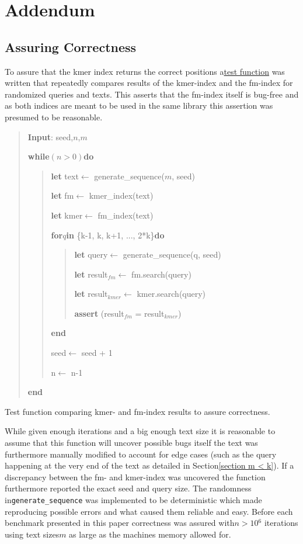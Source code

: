 \newpage{}

\chapter{Addendum}

\section{\label{Addendum: Correctness}Assuring Correctness}

To assure that the kmer index returns the correct positions a\href{https://github.com/google/googletest}{test function}
was written that repeatedly compares results of the kmer-index and
the fm-index for randomized queries and texts. This asserts that the
fm-index itself is bug-free and as both indices are meant to be used
in the same library this assertion was presumed to be reasonable.

\begin{algorithm}[H]
\begin{verse}
\textbf{Input}: seed,$n$,$m$

\textbf{while}$(n>0)$\textbf{do}
\begin{verse}
\textbf{let} text$\leftarrow$ generate\_sequence($m$, seed)

\textbf{let} fm$\leftarrow$ kmer\_index(text)

\textbf{let} kmer$\leftarrow$ fm\_index(text)

\textbf{for}$q$\textbf{in} \{k-1, k, k+1, ..., 2{*}k\}\textbf{do}
\begin{verse}
\textbf{let} query$\leftarrow$ generate\_sequence(q, seed)

\textbf{let} result$_{fm}$$\leftarrow$ fm.search(query)

\textbf{let} result$_{kmer}$$\leftarrow$ kmer.search(query)

\textbf{assert} (result$_{fm}$ = result$_{kmer}$)
\end{verse}
\textbf{end}

seed$\leftarrow$ seed + 1

n$\leftarrow$ n-1
\end{verse}
\textbf{end}
\end{verse}
\caption{Test function comparing kmer- and fm-index results to assure correctness.}
\end{algorithm}

While given enough iterations and a big enough text size it is reasonable
to assume that this function will uncover possible bugs itself the
text was furthermore manually modified to account for edge cases (such
as the query happening at the very end of the text as detailed in
Section\ref{section m < k}). If a discrepancy between the fm- and
kmer-index was uncovered the function furthermore reported the exact
seed and query size. The randomness in\lstinline{generate_sequence}
was implemented to be deterministic which made reproducing possible
errors and what caused them reliable and easy. Before each benchmark
presented in this paper correctness was assured with$n>10{{}^6}$
iterations using text sizes$m$ as large as the machines memory allowed
for.

